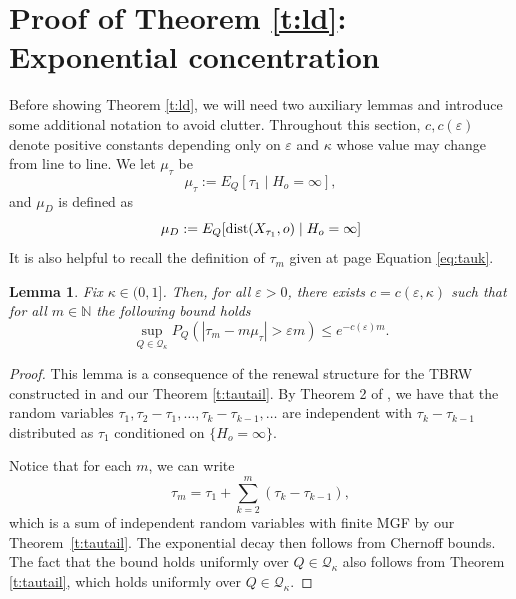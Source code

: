\documentclass[a4paper]{amsart}
\newtheorem{lemma}{Lemma}
\newcommand{\D}[1]{{\rm dist}(X_{#1},o)}
\newcommand{\mutau}{\mu_{\tau}}
\newcommand{\mudtau}{\mu_{D}}
\begin{document}
\section{Proof of Theorem \ref{t:ld}: Exponential concentration}\label{s:ld}
Before showing Theorem \ref{t:ld}, we will need two auxiliary lemmas and introduce some additional notation to avoid clutter. Throughout this section, $c, c(\varepsilon)$ denote positive constants depending only on $\varepsilon$ and $\kappa$ whose value may change from line to line. We let $\mutau$ be
\begin{equation}\label{eq:mutau}
    \mutau := E_Q[ \tau_1 \mid H_o = \infty],
\end{equation}
and $\mudtau$ is defined as
\begin{equation}\label{eq:mudtau}
    \mudtau := E_Q[ \D{\tau_1}\mid H_o = \infty]
\end{equation}
It is also helpful to recall the definition of $\tau_m$ given at page \pageref{eq:tauk} Equation \eqref{eq:tauk}.
\begin{lemma}
\label{l:tau_ld_bound}
Fix $\kappa \in (0,1]$. Then, for all $\varepsilon > 0$, there exists $c = c(\varepsilon, \kappa)$ such that for all $m \in \mathbb{N}$ the following bound holds
    \begin{equation}
       \sup_{Q\in \mathcal{Q}_\kappa} P_Q \left(
                \left|
                    \tau_m - m \mutau
                \right|
                    >
                \varepsilon m
            \right)
            \leq
        e^{-c(\varepsilon) m}.
    \end{equation}  
\end{lemma}

\begin{proof} This lemma is a consequence of the renewal structure for the TBRW constructed in \cite{ribeiro2023} and our Theorem \ref{t:tautail}. By Theorem 2 of \cite{ribeiro2023}, we have that the random variables $\tau_1, \tau_2 - \tau_1, \dots, \tau_{k} - \tau_{k-1}, \dots$ are independent with $\tau_k - \tau_{k-1}$ distributed as $\tau_1$ conditioned on $\{H_o = \infty \}$.

Notice that for each $m$, we can write
$$
\tau_m =  \tau_1 + \sum_{k=2}^m (\tau_{k} - \tau_{k-1}),
$$
which is a sum of independent random variables with finite MGF by our Theorem~\ref{t:tautail}. The exponential decay then follows from Chernoff bounds. The fact that the bound holds uniformly over $Q \in \mathcal{Q}_\kappa$ also follows from Theorem \ref{t:tautail}, which holds uniformly over $Q \in \mathcal{Q}_\kappa$.
\end{proof}
\end{document}
